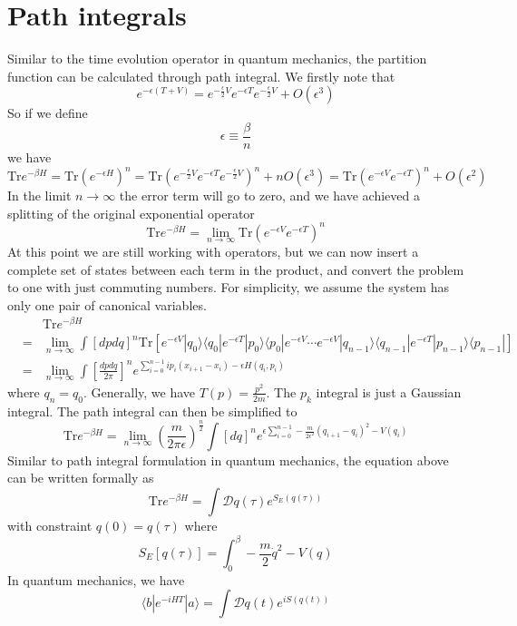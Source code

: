 \section{Path integrals}
Similar to the time evolution operator in quantum mechanics, the partition function can be calculated through path integral. We firstly note that
\[e^{-\epsilon(T+V)} = e^{-\frac{\epsilon}{2} V}e^{-\epsilon T} e^{-\frac{\epsilon}{2} V} + O(\epsilon^3)\]
So if we define
\[\epsilon \equiv \frac{\beta}{n}\]
we have
\[\mathrm{Tr}e^{-\beta H} = \mathrm{Tr} \left( e^{-\epsilon H} \right)^n = \mathrm{Tr} \left(e^{-\frac{\epsilon}{2} V}e^{-\epsilon T} e^{-\frac{\epsilon}{2} V}\right)^n + nO(\epsilon^3) = \mathrm{Tr} \left(e^{-\epsilon V}e^{-\epsilon T} \right)^n + O(\epsilon^2)\]
In the limit $n \to \infty$ the error term will go to zero, and we have achieved a splitting of the original exponential operator
\[\mathrm{Tr}e^{-\beta H} = \lim_{n \to \infty} \mathrm{Tr} \left(e^{-\epsilon V}e^{-\epsilon T} \right)^n\]
At this point we are still working with operators, but we can now insert a complete set of states between each term in the product, and convert the problem to one with just commuting numbers. For simplicity, we assume the system has only one pair of canonical variables.
\begin{eqnarray}
&\phantom{=}& \mathrm{Tr}e^{-\beta H} \nonumber \\
&=& \lim_{n \to \infty} \int [dpdq]^n  \mathrm{Tr} [ e^{-\epsilon V}|q_0\rangle \langle q_0 | e^{-\epsilon T} |p_0 \rangle\langle p_0| e^{-\epsilon V} \cdots e^{-\epsilon V} |q_{n-1}\rangle\langle q_{n-1}| e^{-\epsilon T} |p_{n-1}\rangle\langle p_{n-1} | ] \nonumber \\
&=& \lim_{n \to \infty} \int [\frac{dpdq}{2\pi}]^n e^{\sum_{i=0}^{n-1}ip_i(x_{i+1}-x_i) - \epsilon H(q_i,p_i)} \nonumber
\end{eqnarray}
where $q_{n} = q_0$. 
Generally, we have $T(p) = \frac{p^2}{2m}$. The $p_k$ integral is just a Gaussian integral. The path integral can then be simplified to
\[\mathrm{Tr}e^{-\beta H} = \lim_{n \to \infty} \left( \frac{m}{2\pi \epsilon} \right)^{\frac{n}{2}} \int [dq]^n e^{\epsilon \sum_{i=0}^{n-1}  -\frac{m}{2\epsilon^2}(q_{i+1}-q_i)^2 -  V(q_i)} \]
Similar to path integral formulation in quantum mechanics, the equation above can be written formally as
\[\mathrm{Tr}e^{-\beta H} = \int \mathcal{D}q(\tau) e^{S_E(q(\tau))}\]
with constraint $q(0) = q(\tau)$
where
\[S_E[q(\tau)] = \int_0^{\beta} -\frac{m}{2}\dot{q}^2 - V(q)\]
In quantum mechanics, we have
\[\langle b | e^{-iHT} | a \rangle = \int \mathcal{D}q(t) e^{iS(q(t))}\]
